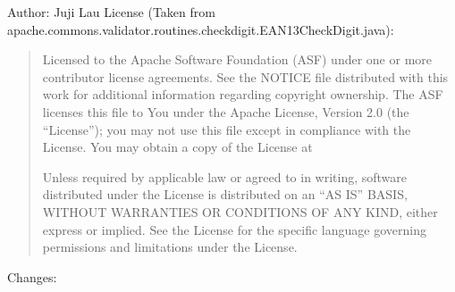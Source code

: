 \documentclass[letterpaper,10pt,english]{sphinxmanual}
\begin{document}
\sphinxAtStartPar
Author: Juji Lau
License (Taken from apache.commons.validator.routines.checkdigit.EAN13CheckDigit.java):
\begin{quote}

\sphinxAtStartPar
Licensed to the Apache Software Foundation (ASF) under one or more
contributor license agreements. See the NOTICE file distributed with
this work for additional information regarding copyright ownership.
The ASF licenses this file to You under the Apache License, Version 2.0
(the “License”); you may not use this file except in compliance with
the License. You may obtain a copy of the License at
\begin{quote}

\sphinxAtStartPar
{}
\end{quote}

\sphinxAtStartPar
Unless required by applicable law or agreed to in writing, software
distributed under the License is distributed on an “AS IS” BASIS,
WITHOUT WARRANTIES OR CONDITIONS OF ANY KIND, either express or implied.
See the License for the specific language governing permissions and
limitations under the License.
\end{quote}

\sphinxAtStartPar
Changes:
\end{document}
